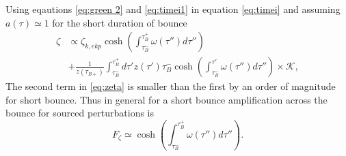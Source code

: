 \documentclass[12pt,a4paper]{article}
\numberwithin{equation}{section}
\numberwithin{equation}{section}
\begin{document}
Using eqautions \eqref{eq:green 2} and \eqref{eq:timei1} in equation \eqref{eq:timei} and assuming $a(\tau) \simeq 1$ for the short duration of bounce 
\begin{equation}
\begin{split}
\zeta &\propto  \zeta_{k,ekp} \cosh(\int_{\tau_{B}^-}^{\tau_B^+} \omega(\tau'') d\tau'') \\
&+ \frac{1}{z(\tau_{B+})} \int_{\tau_{B}^-}^{\tau_B^+} d\tau' z(\tau')   \tau_B^-  \cosh(\int_{\tau_{B}^-}^{\tau'} \omega(\tau'') d\tau'') \times \mathcal{K}  ,
\end{split}
\label{eq:zeta}
\end{equation}
The second term in \eqref{eq:zeta} is smaller than the first by an order of magnitude for short bounce. Thus in general for a short bounce amplification across the bounce for sourced perturbations is 
\begin{equation}
F_{\zeta} \simeq \cosh(\int_{\tau_{B}^-}^{\tau_B^+} \omega(\tau'') d\tau'') .
\label{eq:zeta1}
\end{equation}
\end{document}
